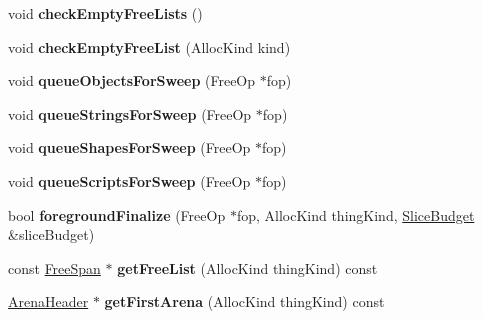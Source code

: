 \begin{DoxyCompactItemize}
\item 
\hypertarget{structjs_1_1gc_1_1_arena_lists_afc3cb6a486b25d600540a20f642cf647}{void {\bfseries check\-Empty\-Free\-Lists} ()}\label{structjs_1_1gc_1_1_arena_lists_afc3cb6a486b25d600540a20f642cf647}

\item 
\hypertarget{structjs_1_1gc_1_1_arena_lists_ab99e8daf49154a45cddc6cdb3bb127e2}{void {\bfseries check\-Empty\-Free\-List} (Alloc\-Kind kind)}\label{structjs_1_1gc_1_1_arena_lists_ab99e8daf49154a45cddc6cdb3bb127e2}

\item 
\hypertarget{structjs_1_1gc_1_1_arena_lists_a85795dd0d897728df9ad9f9f3b2f4166}{void {\bfseries queue\-Objects\-For\-Sweep} (Free\-Op $\ast$fop)}\label{structjs_1_1gc_1_1_arena_lists_a85795dd0d897728df9ad9f9f3b2f4166}

\item 
\hypertarget{structjs_1_1gc_1_1_arena_lists_a53ca5d52c4193f985f757d93f2a51192}{void {\bfseries queue\-Strings\-For\-Sweep} (Free\-Op $\ast$fop)}\label{structjs_1_1gc_1_1_arena_lists_a53ca5d52c4193f985f757d93f2a51192}

\item 
\hypertarget{structjs_1_1gc_1_1_arena_lists_a9153098ba815c8303a4e96e60bb72b52}{void {\bfseries queue\-Shapes\-For\-Sweep} (Free\-Op $\ast$fop)}\label{structjs_1_1gc_1_1_arena_lists_a9153098ba815c8303a4e96e60bb72b52}

\item 
\hypertarget{structjs_1_1gc_1_1_arena_lists_a8fedef6bd6c8388587c8c2008ce2573e}{void {\bfseries queue\-Scripts\-For\-Sweep} (Free\-Op $\ast$fop)}\label{structjs_1_1gc_1_1_arena_lists_a8fedef6bd6c8388587c8c2008ce2573e}

\item 
\hypertarget{structjs_1_1gc_1_1_arena_lists_aeb25ed411579c58c0c259b85bea32254}{bool {\bfseries foreground\-Finalize} (Free\-Op $\ast$fop, Alloc\-Kind thing\-Kind, \hyperlink{structjs_1_1_slice_budget}{Slice\-Budget} \&slice\-Budget)}\label{structjs_1_1gc_1_1_arena_lists_aeb25ed411579c58c0c259b85bea32254}

\item 
\hypertarget{structjs_1_1gc_1_1_arena_lists_af31ff3949a871a0a7fcc1d6235a1476f}{const \hyperlink{structjs_1_1gc_1_1_free_span}{Free\-Span} $\ast$ {\bfseries get\-Free\-List} (Alloc\-Kind thing\-Kind) const }\label{structjs_1_1gc_1_1_arena_lists_af31ff3949a871a0a7fcc1d6235a1476f}

\item 
\hypertarget{structjs_1_1gc_1_1_arena_lists_ad5c24353cc884b96455865fe7865b2ba}{\hyperlink{structjs_1_1gc_1_1_arena_header}{Arena\-Header} $\ast$ {\bfseries get\-First\-Arena} (Alloc\-Kind thing\-Kind) const }\label{structjs_1_1gc_1_1_arena_lists_ad5c24353cc884b96455865fe7865b2ba}


\end{DoxyCompactItemize}
